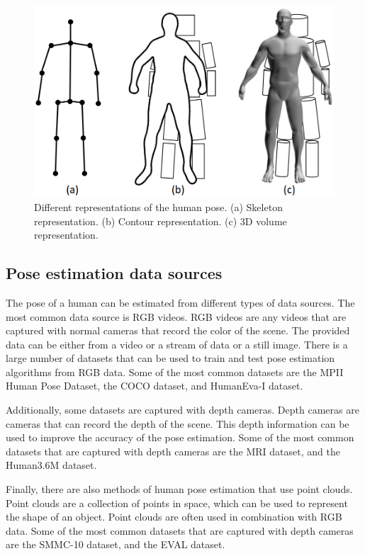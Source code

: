 \begin{figure}
    \centering
    \includegraphics[width=0.8\linewidth]{figures/HPE/PoseRepresentation.png}
    \caption{Different representations of the human pose. (a) Skeleton representation. (b) Contour representation. (c) 3D volume representation. \cite{HPESurveyOriginal}}
    \label{fig:pose_representation}
\end{figure}

\subsection{Pose estimation data sources}

The pose of a human can be estimated from different types of data sources. The most common data source is RGB videos. RGB videos are any videos that are captured with normal cameras that record the color of the scene. The provided data can be either from a video or a stream of data or a still image. There is a large number of datasets that can be used to train and test pose estimation algorithms from RGB data. Some of the most common datasets are the MPII Human Pose Dataset\cite{MPII}, the COCO dataset\cite{Coco}, and HumanEva-I dataset\cite{HumanEva}.

Additionally, some datasets are captured with depth cameras. Depth cameras are cameras that can record the depth of the scene. This depth information can be used to improve the accuracy of the pose estimation. Some of the most common datasets that are captured with depth cameras are the MRI dataset\cite{mRI}, and the Human3.6M dataset\cite{h36m_pami}.

Finally, there are also methods of human pose estimation that use point clouds. Point clouds are a collection of points in space, which can be used to represent the shape of an object. Point clouds are often used in combination with RGB data. Some of the most common datasets that are captured with depth cameras are the SMMC-10 dataset\cite{SMMC10}, and the EVAL dataset\cite{EVAL}.

